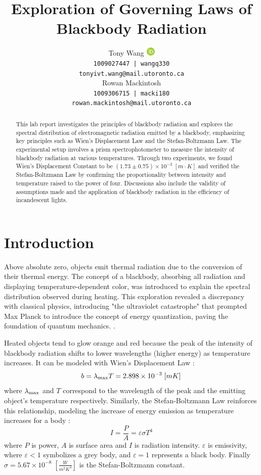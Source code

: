 \documentclass[12pt]{article}
\title{Exploration of Governing Laws of Blackbody Radiation}
\author{
Tony Wang \href{https://orcid.org/0009-0009-3015-7192}{\includegraphics[height=12pt]{figure/orcid.png}}\\
\texttt{1009027447 | wangq330} \\
\texttt{tonyivt.wang@mail.utoronto.ca}\\
\And
Rowan Mackintosh \\
\texttt{1009306715 | macki180} \\
\texttt{rowan.mackintosh@mail.utoronto.ca} \\
}
\begin{document}
\maketitle
\begin{abstract}
This lab report investigates the principles of blackbody radiation and explores the spectral distribution of electromagnetic radiation emitted by a blackbody, emphasizing key principles such as Wien's Displacement Law and the Stefan-Boltzmann Law. The experimental setup involves a prism spectrophotometer to measure the intensity of blackbody radiation at various temperatures. Through two experiments, we found Wien's Displacement Constant to be $(1.73 \pm 0.75) \times 10^{-3}\;[m\cdot K]$ and verified the Stefan-Boltzmann Law by confirming the proportionality between intensity and temperature raised to the power of four. Discussions also include the validity of assumptions made and the application of blackbody radiation in the efficiency of incandescent lights.
\end{abstract}

\section{Introduction}
Above absolute zero, objects emit thermal radiation due to the conversion of their thermal energy. The concept of a blackbody, absorbing all radiation and displaying temperature-dependent color, was introduced to explain the spectral distribution observed during heating. This exploration revealed a discrepancy with classical physics, introducing "the ultraviolet catastrophe" that prompted Max Planck to introduce the concept of energy quantization, paving the foundation of quantum mechanics. \autocite{PhysRevLett.42.835}.

Heated objects tend to glow orange and red because the peak of the intensity of blackbody radiation shifts to lower wavelengths (higher energy) as temperature increases. It can be modeled with Wien's Displacement Law \autocite{manuall}:
\begin{equation}
    b=\lambda_{\rm max}T=2.898\times10^{-3}\;[mK]
    \label{eq:wien}
\end{equation} 
where $\lambda_{\rm max}$ and $T$ correspond to the wavelength of the peak and the emitting object's temperature respectively. Similarly, the Stefan-Boltzmann Law reinforces this relationship, modeling the increase of energy emission as temperature increases for a body \autocite{manuall}:
\begin{equation}
    I=\frac{P}{A}=\varepsilon\sigma T^4
    \label{eq:stefan}
\end{equation}
where $P$ is power, $A$ is surface area and $I$ is radiation intensity. $\varepsilon$ is emissivity, where $\varepsilon<1$ symbolizes a grey body, and $\varepsilon=1$ represents a black body. Finally $\sigma=5.67\times10^{-8}\;\left[\frac{W}{m^2K^{4}}\right]$ is the Stefan-Boltzmann constant.
\end{document}
